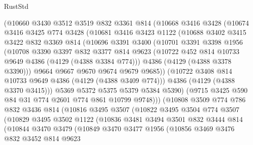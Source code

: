 \begin{lexlean}{RustStd}
\begin{coremodule}
{\begin{coremodule}
{{{{{{{{{{{{{{        (@10660
          @3430
          @3512
          @3519
          @832
          @3361
          @814
          (@10668
            @3416
            @3428
            (@10674
              @3416
              @3425
              @774
              @3428
              (@10681
                @3416
                @3423
                @1122
                (@10688
                  @3402
                  @3415
                  @3422
                  @832
                  @3369
                  @814
                  (@10696
                    @3391
                    @3400
                    (@10701
                      @3391
                      @3398
                      @1956
                      (@10708
                        @3390
                        @3397
                        @832
                        @3377
                        @814
                        @9623
                        (@10722 @452 @814 @10733 @9649 @4386 (@4129 (@4388 @3384 @774)))
                        @4386
                        (@4129 (@4388 @3378 @3390)))
                      @9664
                      @9667
                      @9670
                      @9674
                      @9679
                      @9685))
                  (@10722 @3408 @814 @10733 @9649 @4386 (@4129 (@4388 @3409 @774)))
                  @4386
                  (@4129 (@4388 @3370 @3415)))
                @5369
                @5372
                @5375
                @5379
                @5384
                @5390)
              (@9715 @3425 @590 @84 @31 @774 @2601 @774 @861 @10799 @9748)))
          (@10808
            @3509
            @774
            @786
            @832
            @3436
            @814
            (@10816
              @3495
              @3507
              (@10822
                @3495
                @3504
                @774
                @3507
                (@10829
                  @3495
                  @3502
                  @1122
                  (@10836
                    @3481
                    @3494
                    @3501
                    @832
                    @3444
                    @814
                    (@10844
                      @3470
                      @3479
                      (@10849
                        @3470
                        @3477
                        @1956
                        (@10856
                          @3469
                          @3476
                          @832
                          @3452
                          @814
                          @9623
}}}}}}}}}}}}}}
\end{coremodule}}
\end{coremodule}
\end{lexlean}
